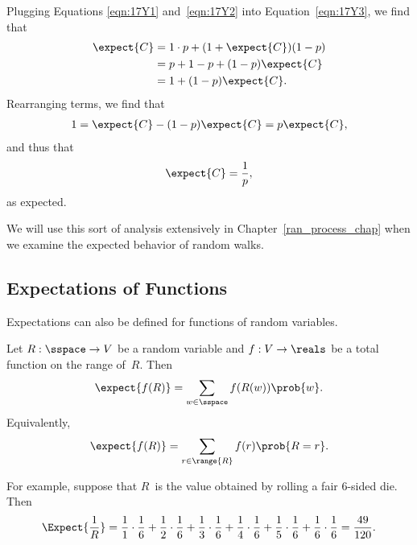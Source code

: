 Plugging Equations \ref{eqn:17Y1} and~\ref{eqn:17Y2} into
Equation~\ref{eqn:17Y3}, we find that
\begin{align*}
\expect{C}
    &= 1 \cdot p + (1 + \expect{C}) (1 - p) \\
    &= p + 1 - p + (1 - p) \expect{C} \\
    &= 1 + (1 - p) \expect{C}.
\end{align*}
Rearranging terms, we find that
\begin{align*}
    1   = \expect{C} - (1 - p) \expect{C} %
        = p \expect{C},
\end{align*}
and thus that
\begin{equation*}
    \expect{C} = \frac{1}{p},
\end{equation*}
as expected.

We will use this sort of analysis extensively in
Chapter~\ref{ran_process_chap} when we examine the expected behavior
of random walks.

\subsection{Expectations of Functions}

Expectations can also be defined for functions of random variables.

\begin{definition}\label{def:exp_func}
Let $R: \sspace \to V$ be a random variable and $f: V \to \reals$ be a
total function on the range of~$R$.  Then
\begin{equation}\label{eqn:17P8}
    \expect{f(R)} = \sum_{w \in \sspace} f(R(w)) \prob{w}.
\end{equation}
Equivalently,
\begin{equation}\label{eqn:17P9}
    \expect{f(R)} = \sum_{r \in \range{R}} f(r) \prob{R = r}.
\end{equation}
\end{definition}

For example, suppose that $R$~is the value obtained by rolling a fair
6-sided die.  Then
\begin{align*}
\Expect{\frac{1}{R}}
    = \frac{1}{1} \cdot \frac{1}{6}
     + \frac{1}{2} \cdot \frac{1}{6}
     + \frac{1}{3} \cdot \frac{1}{6}
     + \frac{1}{4} \cdot \frac{1}{6}
     + \frac{1}{5} \cdot \frac{1}{6}
     + \frac{1}{6} \cdot \frac{1}{6} %
    = \frac{49}{120}.
\end{align*}

